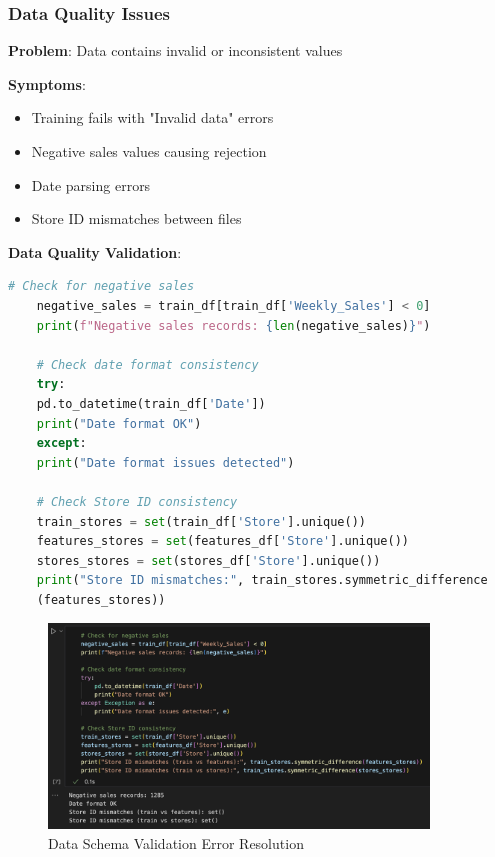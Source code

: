 \subsubsection{Data Quality Issues}

\textbf{Problem}: Data contains invalid or inconsistent values

\textbf{Symptoms}:
\begin{itemize}
	\item Training fails with "Invalid data" errors
	\item Negative sales values causing rejection
	\item Date parsing errors
	\item Store ID mismatches between files
\end{itemize}

\textbf{Data Quality Validation}:
\begin{lstlisting}[language=python,basicstyle=\color{blue}]
	# Check for negative sales
	negative_sales = train_df[train_df['Weekly_Sales'] < 0]
	print(f"Negative sales records: {len(negative_sales)}")
	
	# Check date format consistency
	try:
	pd.to_datetime(train_df['Date'])
	print("Date format OK")
	except:
	print("Date format issues detected")
	
	# Check Store ID consistency
	train_stores = set(train_df['Store'].unique())
	features_stores = set(features_df['Store'].unique())
	stores_stores = set(stores_df['Store'].unique())
	print("Store ID mismatches:", train_stores.symmetric_difference
	(features_stores))
\end{lstlisting}

\begin{figure}[H]
	\centering
	\includegraphics[width=0.9\textwidth]{Images/08Troubleshooting/DataQualityValidation.png}
	\caption{Data Schema Validation Error Resolution}
	\label{fig:data_quality_validation}
\end{figure}


